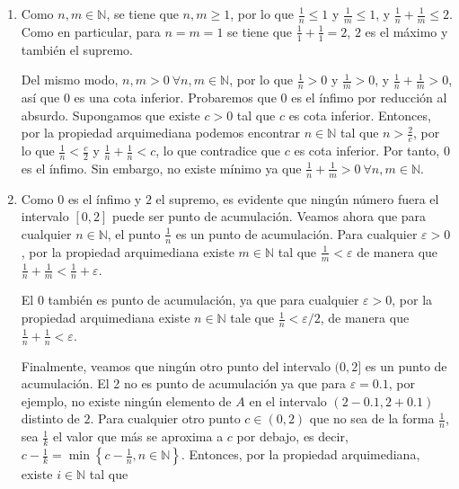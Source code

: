\documentclass[
  spanish,
  a4paper,
]{scrreport}
\theoremstyle{definition}
\theoremstyle{remark}
\begin{document}
\begin{tcolorbox}[enhanced jigsaw, arc=.35mm, bottomrule=.15mm, bottomtitle=1mm, breakable, colback=white, colbacktitle=quarto-callout-tip-color!10!white, colframe=quarto-callout-tip-color-frame, coltitle=black, left=2mm, leftrule=.75mm, opacityback=0, opacitybacktitle=0.6, rightrule=.15mm, title=\textcolor{quarto-callout-tip-color}{\faLightbulb}\hspace{0.5em}{Solución}, titlerule=0mm, toprule=.15mm, toptitle=1mm]

\begin{enumerate}
\def\labelenumi{\alph{enumi}.}
\item
  Como \(n, m \in \mathbb{N}\), se tiene que \(n,m\geq 1\), por lo que
  \(\frac{1}{n}\leq 1\) y \(\frac{1}{m}\leq 1\), y
  \(\frac{1}{n} + \frac{1}{m} \leq 2\). Como en particular, para
  \(n=m=1\) se tiene que \(\frac{1}{1} + \frac{1}{1} = 2\), \(2\) es el
  máximo y también el supremo.

  Del mismo modo, \(n, m>0\ \forall n,m\in \mathbb{N}\), por lo que
  \(\frac{1}{n} > 0\) y \(\frac{1}{m} > 0\), y
  \(\frac{1}{n} + \frac{1}{m} > 0\), así que \(0\) es una cota inferior.
  Probaremos que \(0\) es el ínfimo por reducción al absurdo. Supongamos
  que existe \(c>0\) tal que \(c\) es cota inferior. Entonces, por la
  propiedad arquimediana podemos encontrar \(n\in \mathbb{N}\) tal que
  \(n > \frac{2}{c}\), por lo que \(\frac{1}{n} < \frac{c}{2}\) y
  \(\frac{1}{n} + \frac{1}{n} < c\), lo que contradice que \(c\) es cota
  inferior. Por tanto, \(0\) es el ínfimo. Sin embargo, no existe mínimo
  ya que \(\frac{1}{n} + \frac{1}{m} > 0 \ \forall n,m\in \mathbb{N}\).
\item
  Como \(0\) es el ínfimo y \(2\) el supremo, es evidente que ningún
  número fuera el intervalo \([0, 2]\) puede ser punto de acumulación.
  Veamos ahora que para cualquier \(n\in \mathbb{N}\), el punto
  \(\frac{1}{n}\) es un punto de acumulación. Para cualquier
  \(\varepsilon > 0\), por la propiedad arquimediana existe
  \(m\in \mathbb{N}\) tal que \(\frac{1}{m} < \varepsilon\) de manera
  que \(\frac{1}{n} + \frac{1}{m} < \frac{1}{n} + \varepsilon\).

  El \(0\) también es punto de acumulación, ya que para cualquier
  \(\varepsilon > 0\), por la propiedad arquimediana existe
  \(n\in \mathbb{N}\) tale que \(\frac{1}{n} < \varepsilon/2\), de
  manera que \(\frac{1}{n} + \frac{1}{n} < \varepsilon\).

  Finalmente, veamos que ningún otro punto del intervalo \((0,2]\) es un
  punto de acumulación. El 2 no es punto de acumulación ya que para
  \(\varepsilon = 0.1\), por ejemplo, no existe ningún elemento de \(A\)
  en el intervalo \((2 - 0.1, 2 + 0.1)\) distinto de \(2\). Para
  cualquier otro punto \(c \in (0,2)\) que no sea de la forma
  \(\frac{1}{n}\), sea \(\frac{1}{k}\) el valor que más se aproxima a
  \(c\) por debajo, es decir,
  \(c-\frac{1}{k} = \min\left\{ c - \frac{1}{n}, n\in\mathbb{N}\right\}\).
  Entonces, por la propiedad arquimediana, existe \(i\in \mathbb{N}\)
  tal que


\end{enumerate}
\end{tcolorbox}
\end{document}
